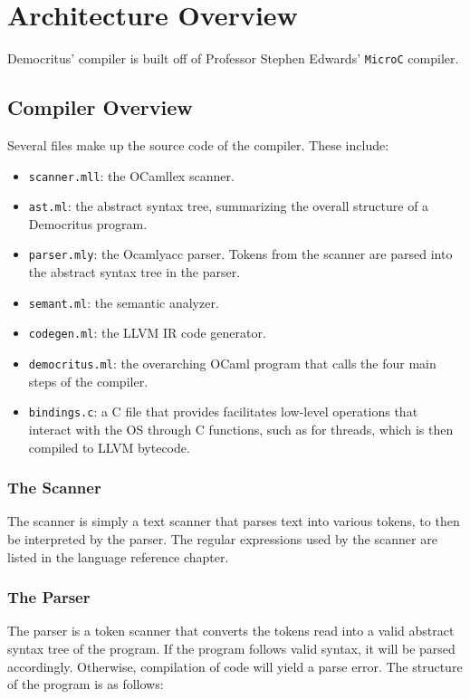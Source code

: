 \chapter{Architecture Overview}
	Democritus' compiler is built off of Professor Stephen Edwards' \texttt{MicroC} compiler. 

\section{Compiler Overview}
  Several files make up the source code of the compiler. These include:
  \begin{itemize}
    \item \texttt{scanner.mll}: the OCamllex scanner.
    \item \texttt{ast.ml}: the abstract syntax tree, summarizing the overall structure of a Democritus program. 
    \item \texttt{parser.mly}: the Ocamlyacc parser. Tokens from the scanner are parsed into the abstract syntax tree in the parser.
    \item \texttt{semant.ml}: the semantic analyzer.
    \item \texttt{codegen.ml}: the LLVM IR code generator.
    \item \texttt{democritus.ml}: the overarching OCaml program that calls the four main steps of the compiler.
    \item \texttt{bindings.c}: a C file that provides facilitates low-level operations that interact with the OS through C functions, such as for threads, which is then compiled to LLVM bytecode.
  \end{itemize}
	\subsection{The Scanner}
    The scanner is simply a text scanner that parses text into various tokens, to then be interpreted by the parser. The regular expressions used by the scanner are listed in the language reference chapter.

	\subsection{The Parser}
    The parser is a token scanner that converts the tokens read into a valid abstract syntax tree of the program. If the program follows valid syntax, it will be parsed accordingly. Otherwise, compilation of code will yield a parse error. The structure of the program is as follows:

